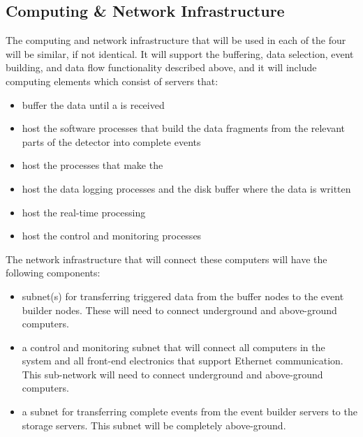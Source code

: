 
\subsection{Computing \& Network Infrastructure}
\label{sec:fd-daq-infra}


The computing and network infrastructure that will be used in each
of the four  will be similar, if not identical.
It will support the buffering, data selection, event
building, and data flow functionality described
above, and it will include computing elements which consist of servers that:

\begin{itemize}
\item buffer the data until a 
  is received
\item host the software processes that
  build the data fragments from the relevant
  parts of the detector into complete events
\item host the processes that make the
\item host the data logging processes and
  the disk buffer where the data is written
\item host the real-time  processing
\item host the control and monitoring processes
\end{itemize}

The network infrastructure that will connect these computers
will have the following components:

\begin{itemize}
\item subnet(s) for transferring triggered data from the buffer
  nodes to the event builder nodes.  These will need to
  connect underground and above-ground computers.
\item a control and monitoring subnet that will connect all
  computers in the  system and all front-end
  electronics that support Ethernet communication.  This
  sub-network will need to connect underground and
  above-ground computers.
\item a subnet for transferring complete events from the
  event builder servers to the storage servers.  This subnet
  will be completely above-ground.
\end{itemize}
